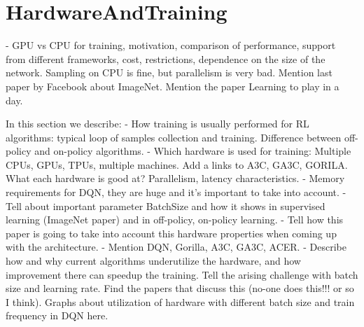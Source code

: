 \section{HardwareAndTraining}


- GPU vs CPU for training, motivation, comparison of performance, support
  from different frameworks, cost, restrictions, dependence on the size of
  the network. Sampling on CPU is fine, but parallelism is very bad.
  Mention last paper by Facebook about ImageNet. Mention the paper Learning
  to play in a day.

In this section we describe:
- How training is usually performed for RL algorithms: typical loop of samples collection
and training. Difference between off-policy and on-policy algorithms.
- Which hardware is used for training: Multiple CPUs, GPUs, TPUs, multiple machines. Add a links to
A3C, GA3C, GORILA. What each hardware is good at? Parallelism, latency characteristics.
- Memory requirements for DQN, they are huge and it's important to take into account.
- Tell about important parameter BatchSize and how it shows in supervised learning (ImageNet paper)
and in off-policy, on-policy learning.
- Tell how this paper is going to take into account this hardware properties when coming up with the
architecture.
- Mention DQN, Gorilla, A3C, GA3C, ACER.
- Describe how and why current algorithms underutilize the hardware, and how
  improvement there can speedup the training. Tell the arising challenge with
  batch size and learning rate. Find the papers that discuss this (no-one does
  this!!! or so I think). Graphs about utilization of hardware with
  different batch size and train frequency in DQN here.
